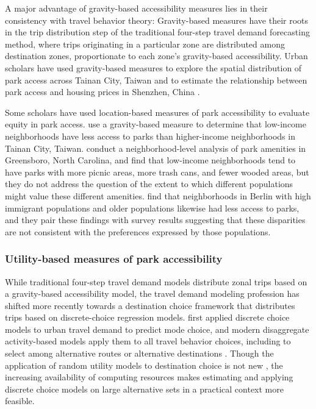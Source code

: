 \documentclass[3p, authoryear, review]{elsarticle} %
\begin{document}
A major advantage of gravity-based accessibility measures lies in their
consistency with travel behavior theory: Gravity-based measures have their roots
in the trip distribution step of the traditional four-step travel demand
forecasting method, where trips originating in a particular zone are distributed
among destination zones, proportionate to each zone's gravity-based
accessibility. Urban scholars have used gravity-based measures to explore the
spatial distribution of park access across Tainan City, Taiwan
\citep{chang2011exploring} and to estimate the relationship between park access and
housing prices in Shenzhen, China \citep{wu2017spatial}.

Some scholars have used location-based measures of park accessibility to
evaluate equity in park access. \citet{chang2011exploring} use a gravity-based measure
to determine that low-income neighborhoods have less access to parks than
higher-income neighborhoods in Tainan City, Taiwan. \citet{bruton2014disparities}
conduct a neighborhood-level analysis of park amenities in Greensboro, North
Carolina, and find that low-income neighborhoods tend to have parks with more
picnic areas, more trash cans, and fewer wooded areas, but they do not address
the question of the extent to which different populations might value these
different amenities. \citet{kabisch2014green} find that neighborhoods in Berlin with
high immigrant populations and older populations likewise had less access to
parks, and they pair these findings with survey results suggesting that these
disparities are not consistent with the preferences expressed by those
populations.

\hypertarget{utility-based-measures-of-park-accessibility}{%
\subsubsection{Utility-based measures of park accessibility}\label{utility-based-measures-of-park-accessibility}}

While traditional four-step travel demand models distribute zonal trips based on
a gravity-based accessibility model, the travel demand modeling profession has
shifted more recently towards a destination choice framework that distributes
trips based on discrete-choice regression models. \citet{mcfadden1974measurement}
first applied discrete choice models to urban travel demand to predict mode
choice, and modern disaggregate activity-based models apply them to all travel
behavior choices, including to select among alternative routes or alternative
destinations \citep{de2011modelling}. Though the application of random utility models
to destination choice is not new \citep[see][]{anas1983discrete}, the increasing
availability of computing resources makes estimating and applying discrete
choice models on large alternative sets in a practical context more feasible.
\end{document}
